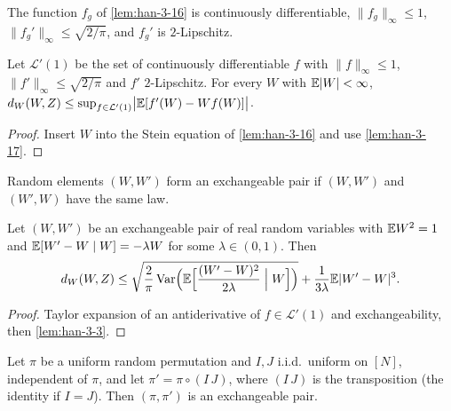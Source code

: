 \begin{lemma}
  \label{lem:han-3-17}
  The function $f_g$ of \cref{lem:han-3-16} is continuously differentiable, $\|f_g\|_\infty\le1$, $\|f_g'\|_\infty\le\sqrt{2/\pi}$, and $f_g'$ is $2$-Lipschitz.
\end{lemma}

\begin{lemma}
  \label{lem:han-3-3}
  Let $\mathcal L'(1)$ be the set of continuously differentiable $f$ with $\|f\|_\infty\le1$, $\|f'\|_\infty\le\sqrt{2/\pi}$ and $f'$ $2$-Lipschitz. For every $W$ with $\mathbb{E}|W|<\infty$,
  $d_W(W,Z)\le\sup_{f\in\mathcal L'(1)}\bigl|\mathbb{E}[f'(W)-Wf(W)]\bigr|$.
\end{lemma}
\begin{proof}
  Insert $W$ into the Stein equation of \cref{lem:han-3-16} and use \cref{lem:han-3-17}.
\end{proof}

\begin{definition}
  \label{def:han-3-1}
  Random elements $(W,W')$ form an exchangeable pair if $(W,W')$ and $(W',W)$ have the same law.
\end{definition}

\begin{lemma}
  \label{lem:han-3-4}
  Let $(W,W')$ be an exchangeable pair of real random variables with $\mathbb{E} W^2=1$ and $\mathbb{E}[W'-W\mid W]=-\lambda W$ for some $\lambda\in(0,1)$. Then
  \[
    d_W(W,Z)\le\sqrt{\frac2\pi\operatorname{Var}\Bigl(\mathbb{E}\Bigl[\frac{(W'-W)^2}{2\lambda}\Bigm|W\Bigr]\Bigr)}+\frac1{3\lambda}\mathbb{E}|W'-W|^3.
  \]
\end{lemma}
\begin{proof}
  Taylor expansion of an antiderivative of $f\in\mathcal L'(1)$ and exchangeability, then \cref{lem:han-3-3}.
\end{proof}

\begin{lemma}
  \label{lem:perm-exchangeable}
  Let $\pi$ be a uniform random permutation and $I,J$ i.i.d.\ uniform on $[N]$, independent of $\pi$, and let $\pi'=\pi\circ(I\,J)$, where $(I\,J)$ is the transposition (the identity if $I=J$). Then $(\pi,\pi')$ is an exchangeable pair.
\end{lemma}


